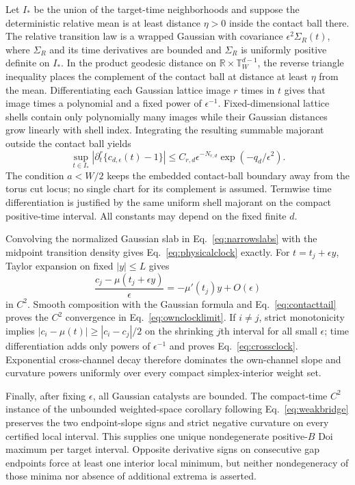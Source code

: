 \documentclass[aps,physrev,reprint,amsmath,amssymb,longbibliography,floatfix]{revtex4-2}
\begin{document}
Let $I_*$ be the union of the target-time neighborhoods and suppose the
deterministic relative mean is at least distance $\eta>0$ inside the contact
ball there.  The relative transition law is a wrapped Gaussian with covariance
$\epsilon^2\Sigma_R(t)$, where $\Sigma_R$ and its time derivatives are bounded
and $\Sigma_R$ is uniformly positive definite on $I_*$.  In the product
geodesic distance on $\mathbb R\times\mathbb T_W^{d-1}$, the reverse triangle
inequality places the complement of the contact ball at distance at least
$\eta$ from the mean.  Differentiating each Gaussian lattice image $r$ times
in $t$ gives that image times a polynomial and a fixed power of
$\epsilon^{-1}$.  Fixed-dimensional lattice shells contain only polynomially
many images while their Gaussian distances grow linearly with shell index.
Integrating the resulting summable majorant outside the contact ball yields
\begin{equation}
 \sup_{t\in I_*}
 |\partial_t^r\{c_{d,\epsilon}(t)-1\}|
 \le C_{r,d}\epsilon^{-N_{r,d}}\exp(-q_d/\epsilon^2).
\label{eq:contacttail}
\end{equation}
The condition $a<W/2$ keeps the embedded contact-ball boundary away from the
torus cut locus; no single chart for its complement is assumed.  Termwise time
differentiation is justified by the same uniform shell majorant on the compact
positive-time interval.  All constants may depend on the fixed finite $d$.

Convolving the normalized Gaussian slab in Eq.~\eqref{eq:narrowslabs} with
the midpoint transition density gives Eq.~\eqref{eq:physicalclock} exactly.
For $t=t_j+\epsilon y$, Taylor expansion on fixed $|y|\le L$ gives
\begin{equation}
 \frac{c_j-\mu(t_j+\epsilon y)}{\epsilon}
 =-\mu'(t_j)y+O(\epsilon)
\label{eq:mutaylor}
\end{equation}
in $C^2$.  Smooth composition with the Gaussian formula and
Eq.~\eqref{eq:contacttail} proves the $C^2$ convergence in
Eq.~\eqref{eq:ownclocklimit}.  If $i\ne j$, strict monotonicity implies
$|c_i-\mu(t)|\ge|c_i-c_j|/2$ on the shrinking $j$th interval for all small
$\epsilon$; time differentiation adds only powers of $\epsilon^{-1}$ and
proves Eq.~\eqref{eq:crossclock}.  Exponential cross-channel decay therefore
dominates the own-channel slope and curvature powers uniformly over every
compact simplex-interior weight set.

Finally, after fixing $\epsilon$, all Gaussian catalysts are bounded.  The
compact-time $C^2$ instance of the unbounded weighted-space corollary following
Eq.~\eqref{eq:weakbridge} preserves the two
endpoint-slope signs and strict negative curvature on every certified local
interval.  This supplies one unique nondegenerate positive-$B$ Doi maximum per
target interval.  Opposite derivative signs on consecutive gap endpoints
force at least one interior local minimum, but neither nondegeneracy of those
minima nor absence of additional extrema is asserted.


\end{document}
